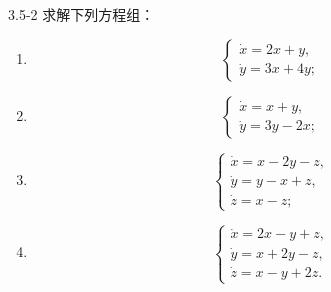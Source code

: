 \documentclass[UTF8,a4paper,11pt]{ctexart}
\begin{document}
\begin{problem}{3.5-2}
求解下列方程组：
  \begin{enumerate}[label=(\arabic*)]
    \item
    \[
    \begin{cases}
      \dot x=2x+y,\\
      \dot y=3x+4y;
    \end{cases}
    \]

    \item
    \[
    \begin{cases}
      \dot x=x+y,\\
      \dot y=3y-2x;
    \end{cases}
    \]

    \item
    \[
    \begin{cases}
      \dot x=x-2y-z,\\
      \dot y=y-x+z,\\
      \dot z=x-z;
    \end{cases}
    \]

    \item
    \[
    \begin{cases}
      \dot x=2x-y+z,\\
      \dot y=x+2y-z,\\
      \dot z=x-y+2z.
    \end{cases}
    \]
  \end{enumerate}
\end{problem}
\end{document}
